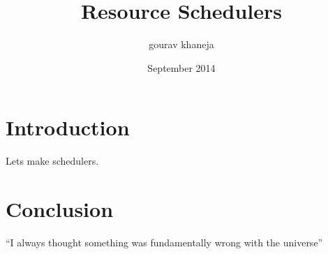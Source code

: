 \documentclass{article}
\title{Resource Schedulers}
\author{gourav khaneja}
\date{September 2014}
\begin{document}
\maketitle

\section{Introduction}
Lets make schedulers.

\section{Conclusion}
``I always thought something was fundamentally wrong with the universe'' \citep{omega}



\end{document}
